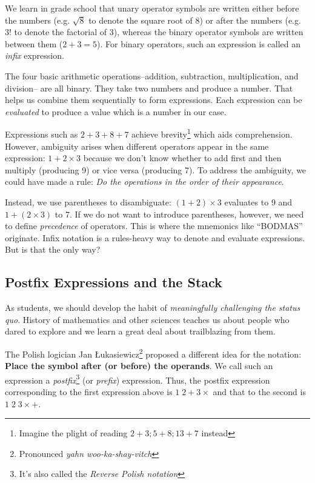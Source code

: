 \documentclass[english,smartquotes]{hgbarticle}
\begin{document}
We learn in grade school that unary operator symbols are written either before the numbers (e.g. $\sqrt 8$ to denote the square root of 8) or after the numbers (e.g. $3!$ to denote the factorial of 3), whereas the binary operator symbols are written between them ($2 + 3 = 5$). For binary operators, such an expression is called an \emph{infix} expression.

The four basic arithmetic operations--addition, subtraction, multiplication, and division-- are all binary. They take two numbers and produce a number. That helps us combine them sequentially to form expressions. Each expression can be \textit{evaluated} to produce a value which is a number in our case.

Expressions such as $2+3+8+7$ achieve brevity\footnote{Imagine the plight of reading $2+3; 5+8; 13+7$ instead} which aids comprehension. However, ambiguity arises when different operators appear in the same expression: $1+2\times 3$ because we don't know whether to add first and then multiply (producing 9) or vice versa (producing 7). To address the ambiguity, we could have made a rule: \textit{Do the operations in the order of their appearance}.  

Instead, we use parentheses to disambiguate: $(1+2)\times 3$ evaluates to 9 and $1+(2\times 3)$ to 7. If we do not want to introduce parentheses, however, we need to define \textit{precedence} of operators. This is where the mnemonics like ``BODMAS'' originate.  Infix notation is a rules-heavy way to denote and evaluate expressions. But is that the only way?

\subsection{Postfix Expressions and the Stack}
As students, we should develop the habit of \emph{meaningfully challenging the status quo}. History of mathematics and other sciences teaches us about people who dared to explore and we learn a great deal about trailblazing from them.

The Polish logician Jan Łukasiewicz\footnote{Pronounced \textit{yahn woo-ka-shay-vitch}} proposed a different idea for the notation\cite{Hamblin1962}: \textbf{Place the symbol after (or before) the operands}. We call such an expression a \emph{postfix}\footnote{It's also called the \emph{Reverse Polish notation}} (or \emph{prefix}) expression. Thus, the postfix expression corresponding to the first expression above is $1\;2 + 3\times$ and that to the second is $1\;2\;3\times +$. 
\end{document}
